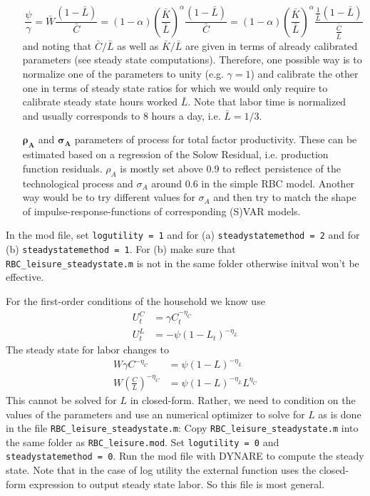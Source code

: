 \begin{Solution}{5}
\begin{itemize}
			$$\frac{\psi}{\gamma} = \bar{W}\frac{(1-\bar{L})}{\bar{C}}= (1-\alpha)\left(\frac{\bar{K}}{\bar{L}}\right)^\alpha\frac{(1-\bar{L})}{\bar{C}} = (1-\alpha)\left(\frac{\bar{K}}{\bar{L}}\right)^\alpha\frac{\frac{1}{\bar{L}}(1-\bar{L})}{\frac{\bar{C}}{\bar{L}}}$$
			and noting that $\bar{C}/\bar{L}$ as well as $\bar{K}/\bar{L}$ are given in terms of already calibrated parameters (see steady state computations). Therefore, one possible way is to normalize one of the parameters to unity (e.g. $\gamma=1$) and calibrate the other one in terms of steady state ratios for which we would only require to calibrate steady state hours worked $\bar{L}$. Note that labor time is normalized and usually corresponds to 8 hours a day, i.e. $\bar{L}=1/3$.
			\item[$\boldsymbol{\rho_A}$ and $\boldsymbol{\sigma_A}$] parameters of process for total factor productivity. These can be estimated based on a regression of the Solow Residual, i.e. production function residuals. $\rho_A$ is mostly set above 0.9 to reflect persistence of the technological process and $\sigma_A$ around $0.6$ in the simple RBC model. Another way would be to try different values for $\sigma_A$ and then try to match the shape of impulse-response-functions of corresponding (S)VAR models.
		\end{itemize}
		
\end{Solution}
\begin{Solution}{6}
		In the mod file, set \texttt{logutility = 1} and for (a) \texttt{steadystatemethod = 2} and for (b) \texttt{steadystatemethod = 1}. For (b) make sure that \texttt{RBC\_leisure\_steadystate.m} is not in the same folder otherwise initval won't be effective.
		
\end{Solution}
\begin{Solution}{7}
	For the first-order conditions of the household we know use
	\begin{align*}
	U_t^C &= \gamma C_t^{-\eta_C}\\
	U_t^L &= - \psi (1-L_t)^{-\eta_L}
	\end{align*}
	The steady state for labor changes to
	\begin{align*}
		W \gamma C^{-\eta_C} &= \psi(1-L)^{-\eta_L}\\
		W  \left(\frac{C}{L}\right)^{-\eta_C} &= \psi(1-L)^{-\eta_L}L^{\eta_C}
	\end{align*}
	This cannot be solved for $L$ in closed-form. Rather, we need to condition on the values of the parameters and use an numerical optimizer to solve for $L$ as is done in the file \texttt{RBC\_leisure\_steadystate.m}:
	Copy \texttt{RBC\_leisure\_steadystate.m} into the same folder as \texttt{RBC\_leisure.mod}. Set \texttt{logutility = 0} and \texttt{steadystatemethod = 0}. Run the mod file with DYNARE to compute the steady state. Note that in the case of log utility the external function uses the closed-form expression to output steady state labor. So this file is most general.
	
\end{Solution}

